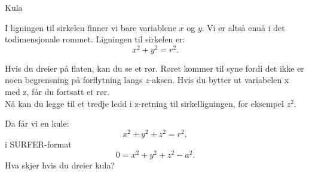 \documentclass[no]{./../../common/SurferDesc}%
\begin{document}
\footnotesize
%
\begin{surferPage}
  \begin{surferTitle}Kula\end{surferTitle}
   \begin{surferText}
   
I ligningen til sirkelen finner vi bare variablene $x$ og $y$. Vi er altså ennå i det todimensjonale rommet. 
Ligningen til sirkelen er:
\[x^2+y^2=r^2.\]

Hvis du dreier på flaten, kan du se et rør. Røret kommer til syne fordi det ikke er 
noen begrensning på forflytning langs $z$-aksen. Hvis du bytter ut variabelen x med z, får du fortsatt 
et rør. \\

Nå kan du legge til et tredje ledd i z-retning til sirkelligningen, for eksempel $z^2$. 

Da får vi en kule:
\[x^2+y^2+z^2=r^2,\]
i SURFER-format
\[0=x^2+y^2+z^2-a^2.\]
Hva skjer hvis du dreier kula?

     \end{surferText}
\end{surferPage}
\end{document}
